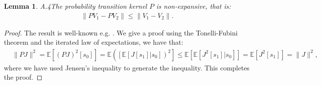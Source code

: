 \documentclass[12pt]{article}
\newtheorem{proof}{Proof}
\newtheorem{lemma}{Lemma}
\begin{document}
\begin{lemma}{A.4}\label{non_expansive_P}
The probability transition kernel $P$ is non-expansive, that is:
\begin{align}
    \|PV_1-PV_2\|\leq \|V_1-V_2\|.
\end{align}
\end{lemma} 
\begin{proof}
The result is well-known e.g. \cite{tsitsiklis1999optimal}. We give a proof using the Tonelli-Fubini theorem and the iterated law of expectations, we have that:
\begin{align*}
&\|PJ\|^2=\mathbb{E}\left[(PJ)^2[s_0]\right]=\mathbb{E}\left(\left[\mathbb{E}\left[J[s_1]|s_0\right]\right)^2\right]
\leq \mathbb{E}\left[\mathbb{E}\left[J^2[s_1]|s_0\right]\right] 
= \mathbb{E}\left[J^2[s_1]\right]=\|J\|^2,
\end{align*}
where we have used Jensen's inequality to generate the inequality. This completes the proof.
\end{proof}
\end{document}
